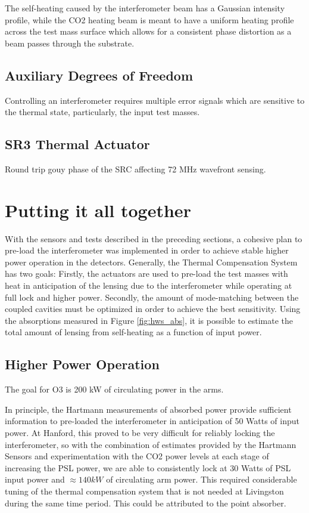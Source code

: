 	The self-heating caused by the interferometer beam has a Gaussian intensity profile, while the CO2 heating beam is meant to have a uniform heating profile across the test mass surface which allows for a consistent phase distortion as a beam passes through the substrate.
	
	\subsection{Auxiliary Degrees of Freedom}
	Controlling an interferometer requires multiple error signals which are sensitive to the thermal state, particularly, the input test masses.
	
	\subsection{SR3 Thermal Actuator}

	Round trip gouy phase of the SRC affecting 72 MHz wavefront sensing.
	
\section{Putting it all together}
	With the sensors and tests described in the preceding sections, a cohesive plan to pre-load the interferometer was implemented in order to achieve stable higher power operation in the detectors.  Generally, the Thermal Compensation System has two goals: Firstly, the actuators are used to pre-load the test masses with heat in anticipation of the lensing due to the interferometer while operating at full lock and higher power.  Secondly, the amount of mode-matching between the coupled cavities must be optimized in order to achieve the best sensitivity.  Using the absorptions measured in Figure \ref{fig:hws_abs}, it is possible to estimate the total amount of lensing from self-heating as a function of input power.
	
	
\subsection{Higher Power Operation}
	The goal for O3 is 200 kW of circulating power in the arms.
	
	In principle, the Hartmann measurements of absorbed power provide sufficient information to pre-loaded the interferometer in anticipation of 50 Watts of input power. At Hanford, this proved to be very difficult for reliably locking the interferometer, so with the combination of estimates provided by the Hartmann Sensors and experimentation with the CO2 power levels at each stage of increasing the PSL power, we are able to consistently lock at 30 Watts of PSL input power and $\approx 140 kW$ of circulating arm power.  This required considerable tuning of the thermal compensation system that is not needed at Livingston during the same time period.  This could be attributed to the point absorber.
	

